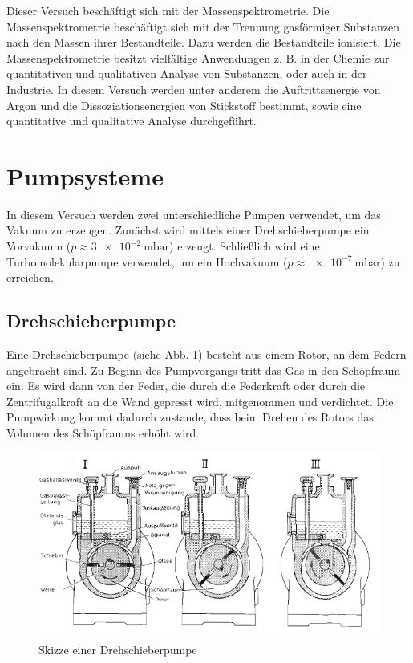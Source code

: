 Dieser Versuch beschäftigt sich mit der Massenspektrometrie. Die Massenspektrometrie beschäftigt sich mit der Trennung gasförmiger Substanzen nach den Massen ihrer Bestandteile. Dazu werden die Bestandteile ionisiert. Die Massenspektrometrie besitzt vielfältige Anwendungen z. B. in der Chemie zur quantitativen und qualitativen Analyse von Substanzen, oder auch in der Industrie.
In diesem Versuch werden unter anderem die Auftrittsenergie von Argon und die Dissoziationsenergien von Stickstoff bestimmt, sowie eine quantitative und qualitative Analyse durchgeführt.

\section{Pumpsysteme}

In diesem Versuch werden zwei unterschiedliche Pumpen verwendet, um das Vakuum zu erzeugen. Zunächst wird mittels einer Drehschieberpumpe ein Vorvakuum ($p\approx\SI{3e-2}{\milli\bar}$) erzeugt. Schließlich wird eine Turbomolekularpumpe verwendet, um ein Hochvakuum ($p\approx\SI{e-7}{\milli\bar}$) zu erreichen.

\subsection{Drehschieberpumpe}

Eine Drehschieberpumpe (siehe Abb. \ref{fig011}) besteht aus einem Rotor, an dem Federn angebracht sind. Zu Beginn des Pumpvorgangs tritt das Gas in den Schöpfraum ein. Es wird dann von der Feder, die durch die Federkraft oder durch die Zentrifugalkraft an die Wand gepresst wird, mitgenommen und verdichtet.
Die Pumpwirkung kommt dadurch zustande, dass beim Drehen des Rotors das Volumen des Schöpfraums erhöht wird.

\begin{figure}[tb]
 \centering
 \includegraphics[scale=0.7]{./fig/massenspek_drehschieber.png}
 \caption{Skizze einer Drehschieberpumpe}
 \label{fig011}
\end{figure}

